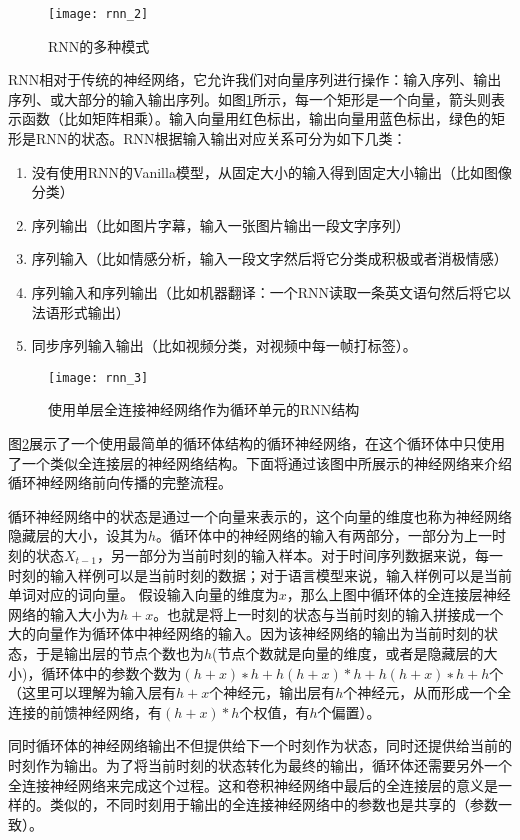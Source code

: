\begin{figure}[htp]
\centering
\texttt{[image: rnn\_2]}
\caption{RNN的多种模式}
\label{fig:rnn_2}
\end{figure}
RNN相对于传统的神经网络，它允许我们对向量序列进行操作：输入序列、输出序列、或大部分的输入输出序列。如图\ref{fig:rnn_2}所示，每一个矩形是一个向量，箭头则表示函数（比如矩阵相乘）。输入向量用红色标出，输出向量用蓝色标出，绿色的矩形是RNN的状态。RNN根据输入输出对应关系可分为如下几类：
\begin{enumerate}
    \item 没有使用RNN的Vanilla模型，从固定大小的输入得到固定大小输出（比如图像分类）
    \item 序列输出（比如图片字幕，输入一张图片输出一段文字序列）
    \item 序列输入（比如情感分析，输入一段文字然后将它分类成积极或者消极情感）
    \item 序列输入和序列输出（比如机器翻译：一个RNN读取一条英文语句然后将它以法语形式输出）
    \item 同步序列输入输出（比如视频分类，对视频中每一帧打标签）。
\end{enumerate}

\begin{figure}[htp]
\centering
\texttt{[image: rnn\_3]}
\caption{使用单层全连接神经网络作为循环单元的RNN结构}
\label{fig:rnn_3}
\end{figure}

图\ref{fig:rnn_3}展示了一个使用最简单的循环体结构的循环神经网络，在这个循环体中只使用了一个类似全连接层的神经网络结构。下面将通过该图中所展示的神经网络来介绍循环神经网络前向传播的完整流程。

循环神经网络中的状态是通过一个向量来表示的，这个向量的维度也称为神经网络隐藏层的大小，设其为$h$。循环体中的神经网络的输入有两部分，一部分为上一时刻的状态$X_{t-1}$，另一部分为当前时刻的输入样本。对于时间序列数据来说，每一时刻的输入样例可以是当前时刻的数据；对于语言模型来说，输入样例可以是当前单词对应的词向量。
假设输入向量的维度为$x$，那么上图中循环体的全连接层神经网络的输入大小为$h+x$。也就是将上一时刻的状态与当前时刻的输入拼接成一个大的向量作为循环体中神经网络的输入。因为该神经网络的输出为当前时刻的状态，于是输出层的节点个数也为$h$(节点个数就是向量的维度，或者是隐藏层的大小)，循环体中的参数个数为$(h+x)∗h+h(h+x)*h+h(h+x)∗h+h$个（这里可以理解为输入层有$h+x$个神经元，输出层有$h$个神经元，从而形成一个全连接的前馈神经网络，有$(h+x)*h$个权值，有$h$个偏置）。

同时循环体的神经网络输出不但提供给下一个时刻作为状态，同时还提供给当前的时刻作为输出。为了将当前时刻的状态转化为最终的输出，循环体还需要另外一个全连接神经网络来完成这个过程。这和卷积神经网络中最后的全连接层的意义是一样的。类似的，不同时刻用于输出的全连接神经网络中的参数也是共享的（参数一致）。

